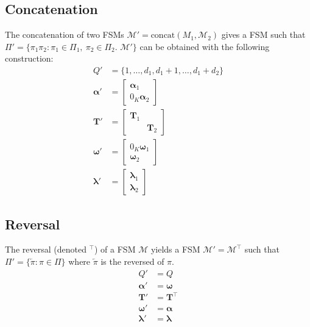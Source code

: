 \subsection{Concatenation}

The concatenation of two FSMs $\mathcal{M}' = \text{concat}({M}_1, \mathcal{M}_2)$ gives a FSM such that $\Pi' = \{\pi_1 \pi_2 : \pi_1 \in \Pi_1, \ \pi_2 \in \Pi_2$. $\mathcal{M}'\}$
can be obtained with the following construction:
\begin{align}
    Q' &= \{1, \dots, d_1, d_1 + 1, \dots, d_1 + d_2 \} \\
    \boldsymbol{\alpha}' &= \begin{bmatrix}
        \boldsymbol{\alpha}_1 \\
        0_K \boldsymbol{\alpha}_2
    \end{bmatrix} \\
    \mathbf{T}' &= \begin{bmatrix}
        \mathbf{T}_1 & \\
        & \mathbf{T}_2
    \end{bmatrix} \\
    \boldsymbol{\omega}' &= \begin{bmatrix}
        0_K \boldsymbol{\omega}_1 \\
        \boldsymbol{\omega}_2
    \end{bmatrix}\\
    \boldsymbol{\lambda}' &= \begin{bmatrix}
        \boldsymbol{\lambda}_1 \\
        \boldsymbol{\lambda}_2
    \end{bmatrix}
\end{align}

\subsection{Reversal}

The reversal (denoted $^\top$) of a FSM $\mathcal{M}$ yields a FSM
$\mathcal{M}' = \mathcal{M}^\top$ such that $\Pi' = \{ \overleftarrow{\pi} : \pi \in \Pi \}$ where $\overleftarrow{\pi}$ is the reversed of $\pi$.
\begin{align}
    Q' &= Q \\
    \boldsymbol{\alpha}' &= \boldsymbol{\omega} \\
    \mathbf{T}' &= \mathbf{T}^\top \\
    \boldsymbol{\omega}' &= \boldsymbol{\alpha} \\
    \boldsymbol{\lambda}' &= \boldsymbol{\lambda}
\end{align}

